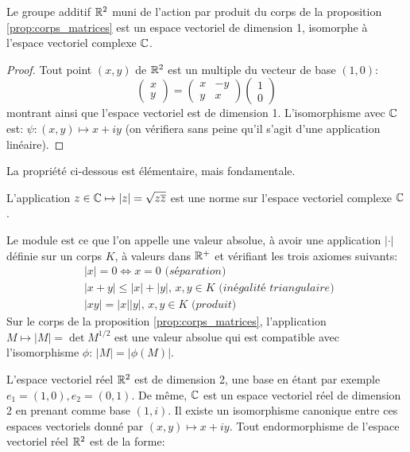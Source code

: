 \begin{fprop}
\label{prop:r2_c}
Le groupe additif $\mathbb R^2$ muni de l'action par produit du corps de la proposition \ref{prop:corps_matrices} est un espace vectoriel de dimension 1, isomorphe à l'espace vectoriel complexe $\mathbb{C}$.
\end{fprop}
\begin{proof}
Tout point $(x,y)$ de $\mathbb R^2$ est un multiple du vecteur de base $(1,0)$:
\[
\begin{pmatrix}
x \\
y
\end{pmatrix} = 
\begin{pmatrix}
x & -y \\
y & x 
\end{pmatrix}
\begin{pmatrix}
1 \\0
\end{pmatrix}
\]
montrant ainsi que l'espace vectoriel est de dimension 1. 
L'isomorphisme avec $\mathbb{C}$ est: $\psi \colon (x,y) \mapsto x + i y$ (on vérifiera sans peine qu'il s'agit d'une application linéaire).
\end{proof}
La propriété ci-dessous est élémentaire, mais fondamentale.
\begin{fprop}
L'application  $z \in \mathbb{C} \mapsto |z|=\sqrt{z \overline{z}}$ est une norme sur l'espace vectoriel complexe $\mathbb{C}$.
\end{fprop}
\begin{rem}
Le module est ce que l'on appelle une valeur absolue, à  avoir une application $| \cdot |$ définie sur un corps $K$, à valeurs dans $\mathbb R^+$ et vérifiant les trois axiomes suivants:
\[
\begin{split}
&|x| = 0 \Leftrightarrow x = 0 \textit{ (séparation) }\\
&|x+y| \leq |x| + |y|, \, x,y  \in K \textit{ (inégalité triangulaire) }\\
& |xy| = |x||y|, \, x,y \in K \textit{ (produit) }
\end{split}
\]
Sur le corps de la proposition \ref{prop:corps_matrices}, l'application $M \mapsto |M| = \det{M}^{1/2}$ est une valeur absolue qui est compatible avec l'isomorphisme $\phi$: $|M| = |\phi(M)|$.
\end{rem}
L'espace vectoriel réel $\mathbb R^2$ est de dimension 2, une base en étant par exemple $e_1=(1,0), e_2 = (0,1)$. De même, $\mathbb{C}$ est un espace vectoriel réel de dimension 2 en prenant comme base $(1,i)$. Il existe un isomorphisme canonique entre ces espaces vectoriels donné par $(x,y) \mapsto x + i y$. Tout endormorphisme de l'espace vectoriel réel $\mathbb R^2$ est de la forme:

